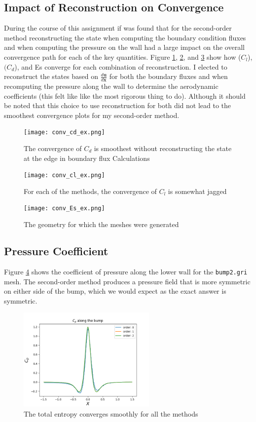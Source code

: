 \documentclass{article}
\begin{document}
\subsection{Impact of Reconstruction on Convergence}
During the course of this assignment if was found that for the second-order method reconstructing the state when computing the boundary condition fluxes and when computing the pressure on the wall had a large impact on the overall convergence path for each of the key quantities.
Figure \ref{fig:conv_cl_ex}, \ref{fig:conv_cd_ex}, and \ref{fig:conv_Es_ex} show how  ($C_l$), $(C_d$), and Es converge for each combination of reconstruction.
I elected to reconstruct the states based on $\frac{d\mathbf{u}}{d\mathbf{x}}$ for both the boundary fluxes and when recomputing the pressure along the wall to determine the aerodynamic coefficients (this felt like like the most rigorous thing to do).
Although it should be noted that this choice to use reconstruction for both did not lead to the smoothest convergence plots for my second-order method.


\begin{figure}[H]
	\centering
	\texttt{[image: conv\_cd\_ex.png]}
	\caption{The convergence of $C_d$ is smoothest without reconstructing the state at the edge in boundary flux Calculations}
	\label{fig:conv_cl_ex}
\end{figure}
\begin{figure}[H]
	\centering
	\texttt{[image: conv\_cl\_ex.png]}
	\caption{For each of the methods, the convergence of $C_l$ is somewhat jagged}
	\label{fig:conv_cd_ex}
\end{figure}
\begin{figure}[H]
	\centering
	\texttt{[image: conv\_Es\_ex.png]}
	\caption{The geometry for which the meshes were generated}
	\label{fig:conv_Es_ex}
\end{figure}


\subsection{Pressure Coefficient}
Figure \ref{fig:cp} shows the coefficient of pressure along the lower wall for the \texttt{bump2.gri} mesh.
The second-order method produces a pressure field that is more symmetric on either side of the bump, which we would expect as the exact answer is symmetric.
\begin{figure}[H]
	\centering
	\includegraphics[width=0.60\textwidth,keepaspectratio]{cp.png}
	\caption{The total entropy converges smoothly for all the methods}
	\label{fig:cp}
\end{figure}
\end{document}
